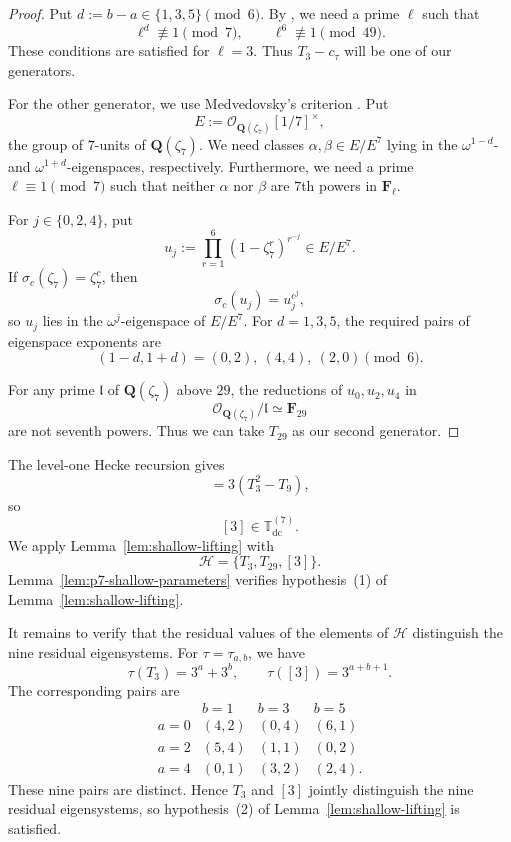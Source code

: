 \documentclass[11pt]{article}
\newcommand{\F}{\mathbf F}
\theoremstyle{plain}
\theoremstyle{definition}
\theoremstyle{remark}
\numberwithin{equation}{section}
\begin{document}
\begin{proof} Put \(d:=b-a\in\{1,3,5\}\pmod6.\) By \cite[Corollary~7.2]{Medvedovsky2015}, we need a prime $\ell$ such that \[\ell^d\not\equiv1\pmod7,\qquad\ell^6\not\equiv1\pmod{49}.\] These conditions are satisfied for \(\ell=3\). Thus \(T_3-c_\tau\) will be one of our generators.

For the other generator, we use Medvedovsky's criterion \cite[Corollary~7.8]{Medvedovsky2015}. Put \[ E:=\mathcal O_{\mathbf Q(\zeta_7)}[1/7]^\times, \] the group of \(7\)-units of \(\mathbf Q(\zeta_7)\). We need classes \(\alpha,\beta\in E/E^7\) lying in the \(\omega^{1-d}\)- and \(\omega^{1+d}\)-eigenspaces, respectively. Furthermore, we need a prime $\ell \equiv 1 \pmod{7}$ such that neither $\alpha$ nor $\beta$ are $7$th powers in $\F_\ell$. 

For \(j\in\{0,2,4\}\), put \[u_j:=\prod_{r=1}^{6}(1-\zeta_7^r)^{r^{-j}}\in E/E^7.\] If \(\sigma_c(\zeta_7)=\zeta_7^c\), then \[\sigma_c(u_j)=u_j^{c^j},\] so \(u_j\) lies in the \(\omega^j\)-eigenspace of \(E/E^7\). For \(d=1,3,5\), the required pairs of eigenspace exponents are \[(1-d,1+d)=(0,2),\ (4,4),\ (2,0)\pmod6.\]

For any prime \(\mathfrak l\) of \(\mathbf Q(\zeta_7)\) above \(29\),
the reductions of \(u_0,u_2,u_4\) in \[\mathcal O_{\mathbf Q(\zeta_7)}/\mathfrak l\simeq \mathbf F_{29}\] are not seventh powers. Thus we can take $T_{29}$ as our second generator.
\end{proof}

The level-one Hecke recursion gives \begin{equation}[3]=3(T_3^2-T_9),\label{eq:p7-weight-in-away}\end{equation} so \[[3]\in\mathbb T_{\mathrm{dc}}^{(7)}.\] We apply Lemma~\ref{lem:shallow-lifting} with \[\mathcal H=\{T_3,T_{29},[3]\}.\] Lemma~\ref{lem:p7-shallow-parameters} verifies hypothesis~(1) of Lemma~\ref{lem:shallow-lifting}. 

It remains to verify that the residual values of the elements of \(\mathcal H\) distinguish the nine residual eigensystems. For \(\tau=\tau_{a,b}\), we have \[\tau(T_3)=3^a+3^b,\qquad\tau([3])=3^{a+b+1}.\] The corresponding pairs are
\[
\begin{array}{c|ccc}
 & b=1 & b=3 & b=5\\ \hline
a=0 & (4,2) & (0,4) & (6,1)\\
a=2 & (5,4) & (1,1) & (0,2)\\
a=4 & (0,1) & (3,2) & (2,4).
\end{array}
\]
These nine pairs are distinct. Hence \(T_3\) and \([3]\) jointly distinguish the nine residual eigensystems, so hypothesis~(2) of Lemma~\ref{lem:shallow-lifting} is satisfied.
\end{document}

